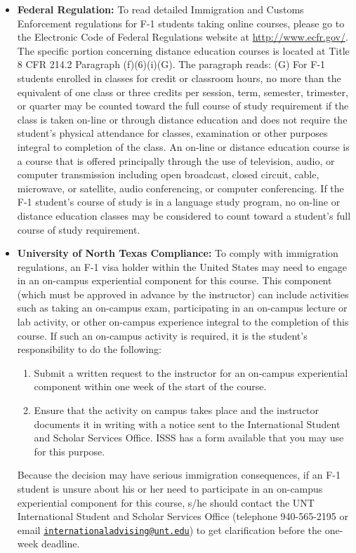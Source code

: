\documentclass[12pt,]{article}
\providecommand{\tightlist}{%
  \setlength{\itemsep}{0pt}\setlength{\parskip}{0pt}}
\begin{document}
\begin{itemize}
\item
  \textbf{Federal Regulation:} To read detailed Immigration and Customs
  Enforcement regulations for F-1 students taking online courses, please
  go to the Electronic Code of Federal Regulations website at
  \url{http://www.ecfr.gov/}. The specific portion concerning distance
  education courses is located at Title 8 CFR 214.2 Paragraph
  (f)(6)(i)(G). The paragraph reads: (G) For F-1 students enrolled in
  classes for credit or classroom hours, no more than the equivalent of
  one class or three credits per session, term, semester, trimester, or
  quarter may be counted toward the full course of study requirement if
  the class is taken on-line or through distance education and does not
  require the student's physical attendance for classes, examination or
  other purposes integral to completion of the class. An on-line or
  distance education course is a course that is offered principally
  through the use of television, audio, or computer transmission
  including open broadcast, closed circuit, cable, microwave, or
  satellite, audio conferencing, or computer conferencing. If the F-1
  student's course of study is in a language study program, no on-line
  or distance education classes may be considered to count toward a
  student's full course of study requirement.
\item
  \textbf{University of North Texas Compliance:} To comply with
  immigration regulations, an F-1 visa holder within the United States
  may need to engage in an on-campus experiential component for this
  course. This component (which must be approved in advance by the
  instructor) can include activities such as taking an on-campus exam,
  participating in an on-campus lecture or lab activity, or other
  on-campus experience integral to the completion of this course. If
  such an on-campus activity is required, it is the student's
  responsibility to do the following:

  \begin{enumerate}
  \def\labelenumi{(\arabic{enumi})}
  \tightlist
  \item
    Submit a written request to the instructor for an on-campus
    experiential component within one week of the start of the course.
  \item
    Ensure that the activity on campus takes place and the instructor
    documents it in writing with a notice sent to the International
    Student and Scholar Services Office. ISSS has a form available that
    you may use for this purpose.
  \end{enumerate}

  Because the decision may have serious immigration consequences, if an
  F-1 student is unsure about his or her need to participate in an
  on-campus experiential component for this course, s/he should contact
  the UNT International Student and Scholar Services Office (telephone
  940-565-2195 or email
  \href{mailto:internationaladvising@unt.edu}{\nolinkurl{internationaladvising@unt.edu}})
  to get clarification before the one-week deadline.
\end{itemize}




\printbibliography
\end{document}
